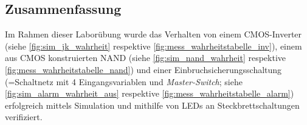 \documentclass[12pt,english,ngerman]{scrartcl}
\begin{document}
\subsection{Zusammenfassung}
Im Rahmen dieser Laborübung wurde das Verhalten von einem CMOS-Inverter (siehe \autoref{fig:sim_jk_wahrheit}
respektive \autoref{fig:mess_wahrheitstabelle_inv}), 
einem aus CMOS konstruierten NAND (siehe \autoref{fig:sim_nand_wahrheit}
respektive \autoref{fig:mess_wahrheitstabelle_nand}) und einer Einbruchsicherungsschaltung 
(=Schaltnetz mit 4 Eingangsvariablen
und \textit{Master-Switch}; siehe \autoref{fig:sim_alarm_wahrheit_aus}
respektive \autoref{fig:mess_wahrheitstabelle_alarm}) erfolgreich mittels 
Simulation und mithilfe von LEDs an Steckbrettschaltungen
verifiziert.
\newpage

\printbibliography

\listoffigures

\listoftables
\end{document}

